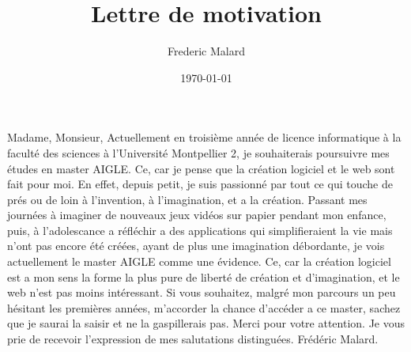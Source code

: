 \documentclass[a4paper]{article}
\title{Lettre de motivation}
\author{Frederic Malard}
\date{\today}
\begin{document}
	\maketitle
    
	Madame, Monsieur,
	\newline\newline
	Actuellement en troisième année de licence informatique à la faculté des sciences à l'Université Montpellier 2, je souhaiterais poursuivre mes études en master AIGLE. Ce, car je pense que la création logiciel et le web sont fait pour moi.
	\newline\newline
	En effet, depuis petit, je suis passionné par tout ce qui touche de prés ou de loin à l'invention, à l'imagination, et a la création. Passant mes journées à imaginer de nouveaux jeux vidéos sur papier pendant mon enfance, puis, à l'adolescance a réfléchir a des applications qui simplifieraient la vie mais n'ont pas encore été créées, ayant de plus une imagination débordante, je vois actuellement le master AIGLE comme une évidence. Ce, car la création logiciel est a mon sens la forme la plus pure de liberté de création et d'imagination, et le web n'est pas moins intéressant.
	\newline\newline
	Si vous souhaitez, malgré mon parcours un peu hésitant les premières années, m'accorder la chance d'accéder a ce master, sachez que je saurai la saisir et ne la gaspillerais pas. Merci pour votre attention.
	\newline\newline
	Je vous prie de recevoir l'expression de mes salutations distinguées.
	\newline
	Frédéric Malard.
\end{document}
